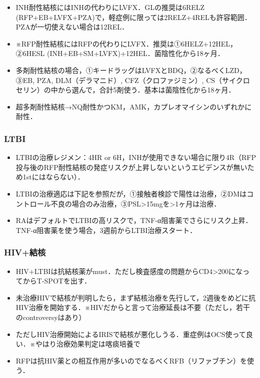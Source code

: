 \begin{itemize}
\item INH耐性結核にはINHの代わりにLVFX．GLの推奨は6RELZ (RFP+EB+LVFX+PZA)で，軽症例に限っては2RELZ+4RELも許容範囲．PZAが一切使えない場合は12REL．
\item ※RFP耐性結核にはRFPの代わりにLVFX．推奨は①6HELZ+12HEL，②6HESL (INH+EB+SM+LVFX)+12HEL．菌陰性化から18ヶ月．
\item 多剤耐性結核の場合，①キードラッグはLVFXとBDQ，②なるべくLZD，③EB, PZA, DLM（デラマニド）, CFZ（クロファジミン）, CS（サイクロセリン）の中から選んで，合計5剤使う．基本は菌陰性化から18ヶ月．
\item 超多剤耐性結核→NQ耐性かつKM，AMK，カプレオマイシンのいずれかに耐性．
\end{itemize}


\subsubsection{LTBI}

\begin{itemize}
\item LTBIの治療レジメン：4HR or 6H，INHが使用できない場合に限り4R（RFP投与後のRFP耐性結核の発症リスクが上昇しないというエビデンスが無いため1stにはならない）．
\item LTBIの治療適応は下記を参照だが，①接触者検診で陽性は治療，②DMはコントロール不良の場合のみ治療，③PSL>15mgを>1ヶ月は治療．
\item RAはデフォルトでLTBIの高リスクで，TNF-α阻害薬でさらにリスク上昇．TNF-α阻害薬を使う場合，3週前からLTBI治療スタート．


\end{itemize}


\subsubsection{HIV+結核}

\begin{itemize}
\item HIV+LTBIは抗結核薬がmust．ただし検査感度の問題からCD4>200になってからT-SPOTを出す．
\item 未治療HIVで結核が判明したら，まず結核治療を先行して，2週後をめどに抗HIV治療を開始する．※HIVだからと言って治療延長は不要（ただし，若干のcontroversyはあり）
\item ただしHIV治療開始によるIRISで結核が悪化しうる．重症例はOCS使って良い．※やはり治療効果判定は喀痰培養で
\item RFPは抗HIV薬との相互作用が多いのでなるべくRFB（リファブチン）を使う．

\end{itemize}

